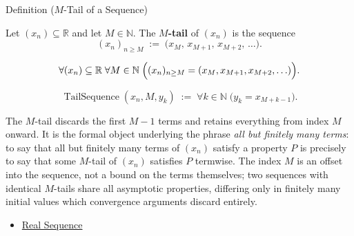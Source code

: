 \begin{definitionbox}{Definition ($M$-Tail of a Sequence)}
\begin{definition}
\label{def:m-tail}

Let $(x_n) \subseteq \mathbb{R}$ and let $M \in \mathbb{N}$. The
\textbf{$M$-tail} of $(x_n)$ is the sequence
\[
    (x_n)_{n \ge M} \;:=\; \bigl(x_M,\, x_{M+1},\, x_{M+2},\, \ldots\bigr).
\]
\end{definition}
\end{definitionbox}

\begin{remark*}
\[
\forall (x_n) \subseteq \mathbb{R} \;\forall M \in \mathbb{N}
\;\Bigl(
    (x_n)_{n \ge M} = (x_M,x_{M+1},x_{M+2},\ldots)
\Bigr).
\]
\end{remark*}

\begin{remark*}
\[
\operatorname{TailSequence}(x_n,M,y_k)
\;:=\;
\forall k \in \mathbb{N}\;\bigl(y_k = x_{M+k-1}\bigr).
\]
\end{remark*}

\begin{remark*}[Interpretation]
The $M$-tail discards the first $M - 1$ terms and retains everything
from index $M$ onward. It is the formal object underlying the phrase
\emph{all but finitely many terms}: to say that all but finitely many
terms of $(x_n)$ satisfy a property $P$ is precisely to say that some
$M$-tail of $(x_n)$ satisfies $P$ termwise. The index $M$ is an offset
into the sequence, not a bound on the terms themselves; two sequences
with identical $M$-tails share all asymptotic properties, differing
only in finitely many initial values which convergence arguments
discard entirely.
\end{remark*}

\begin{dependencies}
\begin{itemize}
  \item \hyperref[def:real-sequence]{Real Sequence}
\end{itemize}
\end{dependencies}



